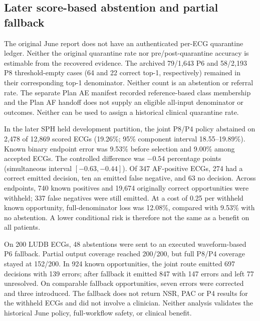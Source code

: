 \subsection{Later score-based abstention and partial fallback}
\label{sec:selective-results}

The original June report does not have an authenticated per-ECG quarantine ledger. Neither the original quarantine rate nor pre/post-quarantine accuracy is estimable from the recovered evidence. The archived 79/1,643 P6 and 58/2,193 P8 threshold-empty cases (64 and 22 correct top-1, respectively) remained in their corresponding top-1 denominator. Neither count is an abstention or referral rate. The separate Plan AE manifest recorded reference-based class membership and the Plan AF handoff does not supply an eligible all-input denominator or outcomes. Neither can be used to assign a historical clinical quarantine rate.

In the later SPH held development partition, the joint P8/P4 policy abstained on 2,478 of 12,869 scored ECGs (19.26\%; 95\% component interval 18.55--19.89\%). Known binary endpoint error was 9.53\% before selection and 9.00\% among accepted ECGs. The controlled difference was $-0.54$ percentage points (simultaneous interval $[-0.63,-0.44]$). Of 347 AF-positive ECGs, 274 had a correct emitted decision, ten an emitted false negative, and 63 no decision. Across endpoints, 740 known positives and 19,674 originally correct opportunities were withheld; 337 false negatives were still emitted. At a cost of 0.25 per withheld known opportunity, full-denominator loss was 12.08\%, compared with 9.53\% with no abstention. A lower conditional risk is therefore not the same as a benefit on all patients.

On 200 LUDB ECGs, 48 abstentions were sent to an executed waveform-based P6 fallback. Partial output coverage reached 200/200, but full P8/P4 coverage stayed at 152/200. In 924 known opportunities, the joint route emitted 697 decisions with 139 errors; after fallback it emitted 847 with 147 errors and left 77 unresolved. On comparable fallback opportunities, seven errors were corrected and three introduced. The fallback does not return NSR, PAC or P4 results for the withheld ECGs and did not involve a clinician. Neither analysis validates the historical June policy, full-workflow safety, or clinical benefit.
